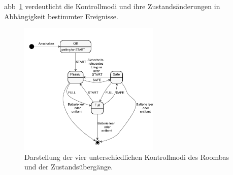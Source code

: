 \acl{abb}~\ref{fig:roombamodi} verdeutlicht die \og Kontrollmodi und ihre Zustandsänderungen in Abhängigkeit bestimmter Ereignisse.

\begin{figure}[ht]
  \centering
  \includegraphics[width=0.6\textwidth]{bilder/implementierung/neuablauf2.pdf}
\caption{Darstellung der vier unterschiedlichen Kontrollmodi des Roombas und der Zustandsübergänge.}
\label{fig:roombamodi}
\end{figure}

